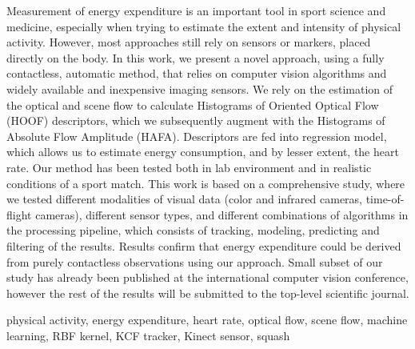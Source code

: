 \abstract
Measurement of energy expenditure is an important tool in sport science and medicine, especially when trying to estimate the extent and intensity of physical activity. However, most approaches still rely on sensors or markers, placed directly on the body. In this work, we present a novel approach, using a fully contactless, automatic method, that relies on computer vision algorithms and widely available and inexpensive imaging sensors. We rely on the estimation of the optical and scene flow to calculate Histograms of Oriented Optical Flow (HOOF) descriptors, which we subsequently augment with the Histograms of Absolute Flow Amplitude (HAFA). Descriptors are fed into regression model, which allows us to estimate energy consumption, and by lesser extent, the heart rate. Our method has been tested both in lab environment and in realistic conditions of a sport match. This work is based on a comprehensive study, where we tested different modalities of visual data (color and infrared cameras, time-of-flight cameras), different sensor types, and different combinations of algorithms in the processing pipeline, which consists of tracking, modeling, predicting and filtering of the results. Results confirm that energy expenditure could be derived from purely contactless observations using our approach. Small subset of our study has already been published at the international computer vision conference, however the rest of the results will be submitted to the top-level scientific journal.

\keywords physical activity, energy expenditure, heart rate, optical flow, scene flow, machine learning, RBF kernel, KCF tracker, Kinect sensor, squash
